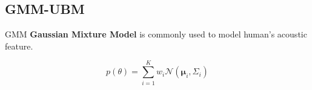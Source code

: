 
\subsection{GMM-UBM}

\begin{frame}{GMM}
  \textbf{Gaussian Mixture Model}
  is commonly used to model human's acoustic feature.

  \begin{exampleblock}{}
    \[ p(\theta) = \sum_{i=1}^{K}{w_i \mathcal{N}(\mathbf{\mu}_i, \Sigma_i)}\]
  \end{exampleblock}
  \pause

  \begin{columns}
    \begin{column}{0.5\textwidth}
      \begin{center}

\end{center}
\end{column}
\end{columns}
\end{frame}
